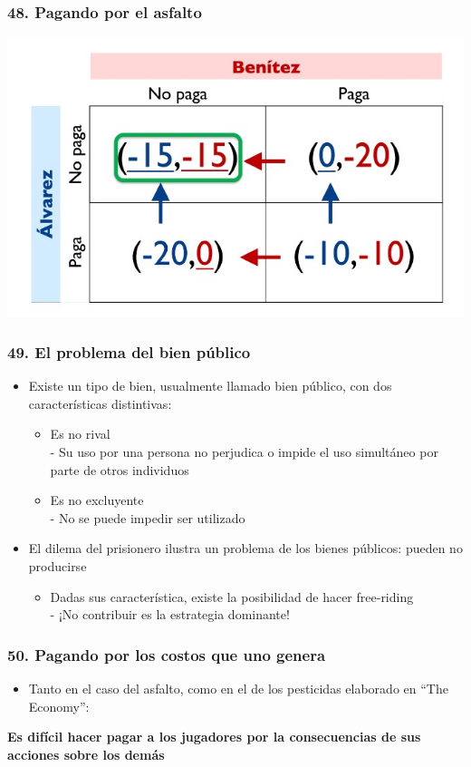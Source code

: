 \documentclass[14pt]{beamer}
\begin{document}
\begin{frame}
\frametitle{48. Pagando por el asfalto}
\centering
\includegraphics[scale=0.6]{Figures/Tema_03_27_abel.jpg}
\end{frame}

\begin{frame}
\frametitle{49. El problema del bien público}
\begin{itemize}
    \item Existe un tipo de bien, usualmente llamado bien público, con dos características distintivas:
    \begin{itemize}
        \item Es no rival \\
        - Su uso por una persona no perjudica o impide el uso simultáneo por parte de otros individuos
        \item Es no excluyente \\
        - No se puede impedir ser utilizado
    \end{itemize}
    \item El dilema del prisionero ilustra un problema de los bienes públicos: pueden no producirse
    \begin{itemize}
        \item Dadas sus característica, existe la posibilidad de hacer free-riding \\
        - ¡No contribuir es la estrategia dominante!
    \end{itemize}
\end{itemize}
\end{frame}

\begin{frame}
\frametitle{50. Pagando por los costos que uno genera}
\begin{itemize}
    \item Tanto en el caso del asfalto, como en el de los pesticidas elaborado en “The Economy”: \\
\end{itemize}
\vspace{5mm}
\textbf{Es difícil hacer pagar a los jugadores por la
consecuencias de sus acciones sobre los demás}
\end{frame}
\end{document}
